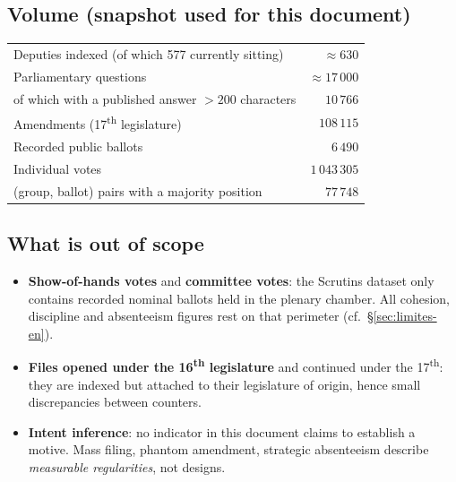 \subsection{Volume (snapshot used for this document)}
\begin{center}\small
\begin{tabular}{@{}lr@{}}
\toprule
Deputies indexed (of which 577 currently sitting) & $\approx 630$ \\
Parliamentary questions & $\approx 17\,000$ \\
\quad of which with a published answer $>200$ characters & $10\,766$ \\
Amendments (17\textsuperscript{th} legislature) & $108\,115$ \\
Recorded public ballots & $6\,490$ \\
Individual votes & $1\,043\,305$ \\
(group, ballot) pairs with a majority position & $77\,748$ \\
\bottomrule
\end{tabular}
\end{center}

\subsection{What is out of scope}
\begin{itemize}
  \item \textbf{Show-of-hands votes} and \textbf{committee votes}: the
        \og{}Scrutins\fg{} dataset only contains recorded nominal ballots held in
        the plenary chamber. All cohesion, discipline and absenteeism figures rest
        on that perimeter (cf.~§\ref{sec:limites-en}).
  \item \textbf{Files opened under the 16\textsuperscript{th} legislature} and
        continued under the 17\textsuperscript{th}: they are indexed but attached
        to their legislature of origin, hence small discrepancies between counters.
  \item \textbf{Intent inference}: no indicator in this document claims to
        establish a motive. \og{}Mass filing\fg{}, \og{}phantom amendment\fg{},
        \og{}strategic absenteeism\fg{} describe \emph{measurable regularities}, not
        designs.
\end{itemize}


